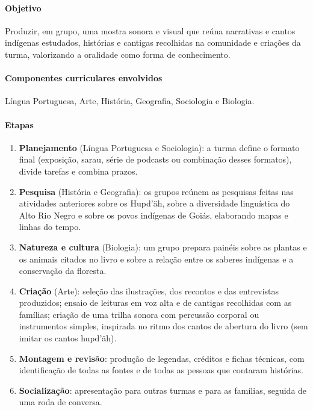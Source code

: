\paragraph{Objetivo} Produzir, em grupo, uma mostra sonora e
visual que reúna narrativas e cantos indígenas estudados, histórias e
cantigas recolhidas na comunidade e criações da turma, valorizando a
oralidade como forma de conhecimento.

\paragraph{Componentes curriculares envolvidos} Língua
Portuguesa, Arte, História, Geografia, Sociologia e Biologia.

\paragraph{Etapas}

\begin{enumerate}[label=\arabic*.]
\item \textbf{Planejamento} (Língua Portuguesa e Sociologia):
a turma define o formato final (exposição, sarau, série de podcasts ou
combinação desses formatos), divide tarefas e combina prazos.
\item \textbf{Pesquisa} (História e Geografia): os grupos
reúnem as pesquisas feitas nas atividades anteriores sobre os Hupd'äh,
sobre a diversidade linguística do Alto Rio Negro e sobre os povos
indígenas de Goiás, elaborando mapas e linhas do tempo.
\item \textbf{Natureza e cultura} (Biologia): um grupo prepara
painéis sobre as plantas e os animais citados no livro e sobre a relação
entre os saberes indígenas e a conservação da floresta.
\item \textbf{Criação} (Arte): seleção das ilustrações, dos
recontos e das entrevistas produzidos; ensaio de leituras em voz alta e
de cantigas recolhidas com as famílias; criação de uma trilha sonora
com percussão corporal ou instrumentos simples, inspirada no ritmo dos
cantos de abertura do livro (sem imitar os cantos hupd'äh).
\item \textbf{Montagem e revisão}: produção de legendas,
créditos e fichas técnicas, com identificação de todas as fontes e de
todas as pessoas que contaram histórias.
\item \textbf{Socialização}: apresentação para outras turmas
e para as famílias, seguida de uma roda de conversa.
\end{enumerate}

